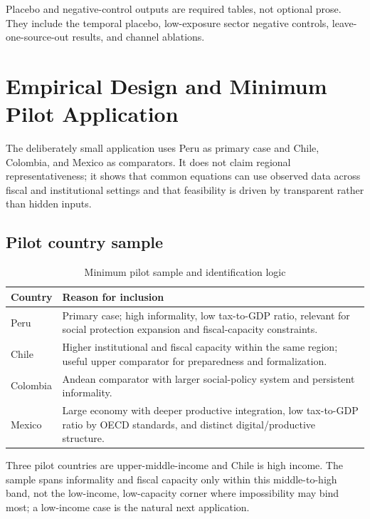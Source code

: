 \documentclass[11pt,a4paper]{article}
\begin{document}
Placebo and negative-control outputs are required tables, not optional prose. They include the temporal placebo, low-exposure sector negative controls, leave-one-source-out results, and channel ablations.

\section{Empirical Design and Minimum Pilot Application}\label{sec:empirical_design}

The deliberately small application uses Peru as primary case and Chile, Colombia, and Mexico as comparators. It does not claim regional representativeness; it shows that common equations can use observed data across fiscal and institutional settings and that feasibility is driven by transparent rather than hidden inputs.

\subsection{Pilot country sample}

\begin{table}[H]
\centering
\caption{Minimum pilot sample and identification logic}
\label{tab:pilot_country_logic}
\small
\begin{tabular}{p{}p{}}
\toprule
Country & Reason for inclusion \\
\midrule
Peru & Primary case; high informality, low tax-to-GDP ratio, relevant for social protection expansion and fiscal-capacity constraints. \\
Chile & Higher institutional and fiscal capacity within the same region; useful upper comparator for preparedness and formalization. \\
Colombia & Andean comparator with larger social-policy system and persistent informality. \\
Mexico & Large economy with deeper productive integration, low tax-to-GDP ratio by OECD standards, and distinct digital/productive structure. \\
\bottomrule
\end{tabular}
\end{table}

Three pilot countries are upper-middle-income and Chile is high income. The sample spans informality and fiscal capacity only within this middle-to-high band, not the low-income, low-capacity corner where impossibility may bind most; a low-income case is the natural next application.
\end{document}

